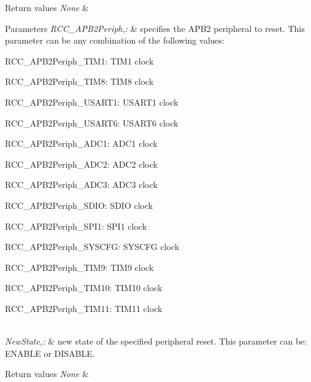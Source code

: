 \begin{DoxyRetVals}{Return values}
{\em None} & \\
\hline
\end{DoxyRetVals}

\begin{DoxyParams}{Parameters}
{\em R\-C\-C\-\_\-\-A\-P\-B2\-Periph,\-:} & specifies the A\-P\-B2 peripheral to reset. This parameter can be any combination of the following values\-: \begin{DoxyItemize}
\item R\-C\-C\-\_\-\-A\-P\-B2\-Periph\-\_\-\-T\-I\-M1\-: T\-I\-M1 clock \item R\-C\-C\-\_\-\-A\-P\-B2\-Periph\-\_\-\-T\-I\-M8\-: T\-I\-M8 clock \item R\-C\-C\-\_\-\-A\-P\-B2\-Periph\-\_\-\-U\-S\-A\-R\-T1\-: U\-S\-A\-R\-T1 clock \item R\-C\-C\-\_\-\-A\-P\-B2\-Periph\-\_\-\-U\-S\-A\-R\-T6\-: U\-S\-A\-R\-T6 clock \item R\-C\-C\-\_\-\-A\-P\-B2\-Periph\-\_\-\-A\-D\-C1\-: A\-D\-C1 clock \item R\-C\-C\-\_\-\-A\-P\-B2\-Periph\-\_\-\-A\-D\-C2\-: A\-D\-C2 clock \item R\-C\-C\-\_\-\-A\-P\-B2\-Periph\-\_\-\-A\-D\-C3\-: A\-D\-C3 clock \item R\-C\-C\-\_\-\-A\-P\-B2\-Periph\-\_\-\-S\-D\-I\-O\-: S\-D\-I\-O clock \item R\-C\-C\-\_\-\-A\-P\-B2\-Periph\-\_\-\-S\-P\-I1\-: S\-P\-I1 clock \item R\-C\-C\-\_\-\-A\-P\-B2\-Periph\-\_\-\-S\-Y\-S\-C\-F\-G\-: S\-Y\-S\-C\-F\-G clock \item R\-C\-C\-\_\-\-A\-P\-B2\-Periph\-\_\-\-T\-I\-M9\-: T\-I\-M9 clock \item R\-C\-C\-\_\-\-A\-P\-B2\-Periph\-\_\-\-T\-I\-M10\-: T\-I\-M10 clock \item R\-C\-C\-\_\-\-A\-P\-B2\-Periph\-\_\-\-T\-I\-M11\-: T\-I\-M11 clock \end{DoxyItemize}
\\
\hline
{\em New\-State,\-:} & new state of the specified peripheral reset. This parameter can be\-: E\-N\-A\-B\-L\-E or D\-I\-S\-A\-B\-L\-E. \\
\hline
\end{DoxyParams}

\begin{DoxyRetVals}{Return values}
{\em None} & \\
\hline
\end{DoxyRetVals}


